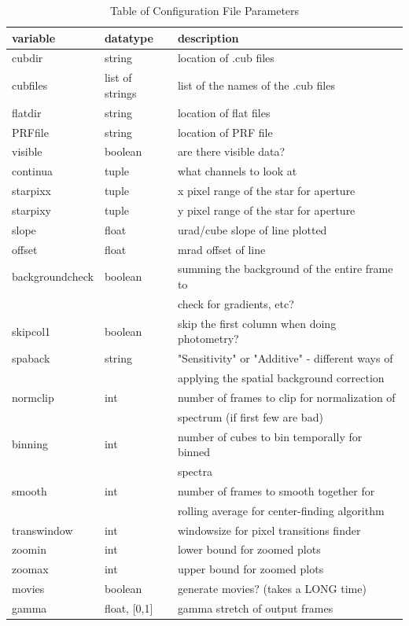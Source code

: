 \documentclass[12pt]{article}
\begin{document}
\begin{table}
\centering
\begin{tabular}[h!]{l|l|l}

variable   &    datatype    &   description\\
\hline
\hline
cubdir     &    string      &   location of .cub files\\
cubfiles   &    list of strings&list of the names of the .cub files\\
flatdir    &    string      &   location of flat files\\
PRFfile    &    string      &   location of PRF file\\
\hline
visible    &    boolean     &   are there visible data?\\
continua   &    tuple       &   what channels to look at\\
\hline
starpixx   &    tuple       &   x pixel range of the star for aperture\\
starpixy   &    tuple       &   y pixel range of the star for aperture\\
\hline
slope      &    float       &   urad/cube slope of line plotted\\
offset     &    float	    &   mrad offset of line\\
\hline
backgroundcheck&boolean     &   summing the background of the entire frame to \\
& & check for gradients, etc?\\
skipcol1   &    boolean     &   skip the first column when doing photometry?\\
\hline
spaback    &    string      &   "Sensitivity" or "Additive" - different ways of\\
& &  applying the spatial background correction\\
\hline
normclip   &    int         &   number of frames to clip for normalization of\\
& & spectrum (if first few are bad)\\
binning    &    int         &   number of cubes to bin temporally for binned\\
& & spectra\\
smooth     &    int         &   number of frames to smooth together for \\
& & rolling average for center-finding algorithm\\
transwindow&    int         &   windowsize for pixel transitions finder\\
\hline
zoomin     &    int         &   lower bound for zoomed plots\\
zoomax     &    int         &   upper bound for zoomed plots\\
\hline
movies     &    boolean     &   generate movies? (takes a LONG time)\\
gamma      &    float, [0,1]&   gamma stretch of output frames\\
\hline
\end{tabular}
\caption{Table of Configuration File Parameters}
\label{tab:configs}
\end{table}
\end{document}

